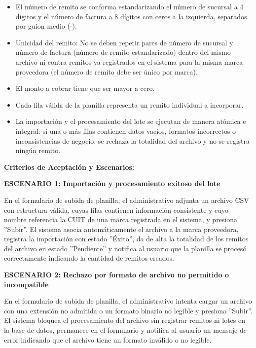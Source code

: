 \documentclass[a4paper,9pt]{article}
\begin{document}
\begin{tcolorbox}[hucard, title={\textbf{HU-2: IMPORTAR PLANILLA DE REMITOS} \hfill \scriptsize \colorbox{tealstatus}{\textbf{\ Accepted\ }} \quad \colorbox{white}{\textcolor{primarydark}{\textbf{\ 5 pts\ }}}}]
{\begin{itemize}[leftmargin=12pt, nosep, itemsep=1.5pt, topsep=1pt]
\item El número de remito se conforma estandarizando el número de sucursal a 4 dígitos y el número de factura a 8 dígitos con ceros a la izquierda, separados por guion medio (-).
\item Unicidad del remito: No se deben repetir pares de número de sucursal y número de factura (número de remito estandarizado) dentro del mismo archivo ni contra remitos ya registrados en el sistema para la misma marca proveedora (el número de remito debe ser único por marca).
\item El monto a cobrar tiene que ser mayor a cero.
\item Cada fila válida de la planilla representa un remito individual a incorporar.
\item La importación y el procesamiento del lote se ejecutan de manera atómica e integral: si una o más filas contienen datos vacíos, formatos incorrectos o inconsistencias de negocio, se rechaza la totalidad del archivo y no se registra ningún remito.
\end{itemize}
}\par\vspace{3pt}
\noindent\textbf{\footnotesize Criterios de Aceptación y Escenarios:}\par\vspace{2pt}
{\footnotesize
\noindent\textbf{\textcolor{secondarydark}{ESCENARIO 1:  Importación y procesamiento exitoso del lote}}\par\vspace{1pt}
En el formulario de subida de planilla, el administrativo adjunta un archivo CSV con estructura válida, cuyas filas contienen información consistente y cuyo nombre referencia la CUIT de una marca registrada en el sistema, y presiona ''Subir''. El sistema asocia automáticamente el archivo a la marca proveedora, registra la importación con estado ''Éxito'', da de alta la totalidad de los remitos del archivo en estado ''Pendiente'' y notifica al usuario que la planilla se procesó correctamente indicando la cantidad de remitos creados.\par\vspace{2.5pt}
\noindent\textbf{\textcolor{secondarydark}{ESCENARIO 2:  Rechazo por formato de archivo no permitido o incompatible}}\par\vspace{1pt}
En el formulario de subida de planilla, el administrativo intenta cargar un archivo con una extensión no admitida o un formato binario no legible y presiona ''Subir''. El sistema bloquea el procesamiento del archivo sin registrar remitos ni lotes en la base de datos, permanece en el formulario y notifica al usuario un mensaje de error indicando que el archivo tiene un formato inválido o no legible.\par\vspace{2.5pt}
}
\end{tcolorbox}
\end{document}
